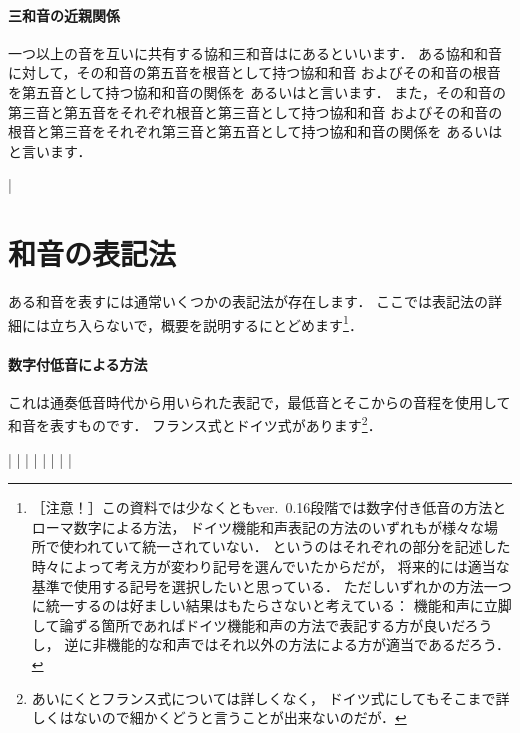 \documentclass[dvipdfmx,uplatex,b5paper,openany,jbase=12Q,nomag*,textwidth-limit=44%
               ]{gachimuchi}[2020/05/05]
\begin{document}
\paragraph{三和音の近親関係}
一つ以上の音を互いに共有する協和三和音はにあるといいます．
ある協和和音に対して，その和音の第五音を根音として持つ協和和音
およびその和音の根音を第五音として持つ協和和音の関係を
あるいはと言います．
また，その和音の第三音と第五音をそれぞれ根音と第三音として持つ協和和音
およびその和音の根音と第三音をそれぞれ第三音と第五音として持つ協和和音の関係を
あるいはと言います．
\begin{Music}[0.6\linewidth]
  \nostartrule%
  \Startpiece%
  \Notes%
  \en\bar%
  \Notes%
  \en%
  \endpiece%
\end{Music}

\section{和音の表記法}
ある和音を表すには通常いくつかの表記法が存在します．
ここでは表記法の詳細には立ち入らないで，概要を説明するにとどめます\footnote{
  ［注意！］この資料では少なくともver.~0.16段階では数字付き低音の方法とローマ数字による方法，
  ドイツ機能和声表記の方法のいずれもが様々な場所で使われていて統一されていない．
  というのはそれぞれの部分を記述した時々によって考え方が変わり記号を選んでいたからだが，
  将来的には適当な基準で使用する記号を選択したいと思っている．
  ただしいずれかの方法一つに統一するのは好ましい結果はもたらさないと考えている：
  機能和声に立脚して論ずる箇所であればドイツ機能和声の方法で表記する方が良いだろうし，
  逆に非機能的な和声ではそれ以外の方法による方が適当であるだろう．
}．

\paragraph{数字付低音による方法}
これは通奏低音時代から用いられた表記で，最低音とそこからの音程を使用して和音を表すものです．
フランス式とドイツ式があります\footnote{あいにくとフランス式については詳しくなく，
ドイツ式にしてもそこまで詳しくはないので細かくどうと言うことが出来ないのだが．
}．
\begin{Music}
  \Startpiece%
  \Notes%
  \figbassu[6]%
  \figbassu[4][6]%
  \figbassu[7]%
  \figbassu[5][6]%
  \figbassu[3][4][6]%
  \figbassu[2]%
  |%
  \en\doublebar%
  \Notes%
  |\prevstaff%
  \en\Notes
  \figbassu[6]|%
  \en\Notes
  \figbassu[4][6]|%
  \en\Notes
  \figbassu[7]|%
  \en\Notes
  \figbassu[5][6]|%
  \en\Notes
  \figbassu[3][4][6]|%
  \en\Notes
  \figbassu[2]|%
  \en\setdoublebar%
  \endpiece%
\end{Music}
\end{document}
